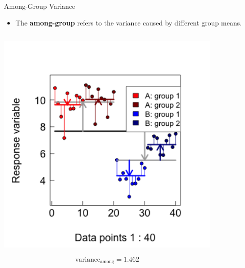 \documentclass{beamer}
\begin{document}
\begin{frame}{Among-Group Variance}
  \begin{itemize}
    \item The \textbf{among-group} refers to the variance caused by different group means.
  \end{itemize}
  \begin{columns}[onlytextwidth] 
  \begin{column}{0.5\textwidth}
  \begin{center}
        \includegraphics[width=0.999\textwidth]{lectures/day_1_intro_to_mems/figures/unnamed-chunk-36-1.png}
      \end{center}
      \[ \text{variance}_{\text{among}} = 1.462 \]
  \end{column}
    \hspace{0.02\textwidth} %
    \begin{column}{0.5\textwidth}
      \begin{center}

\end{center}
\end{column}
\end{columns}
\end{frame}
\end{document}
